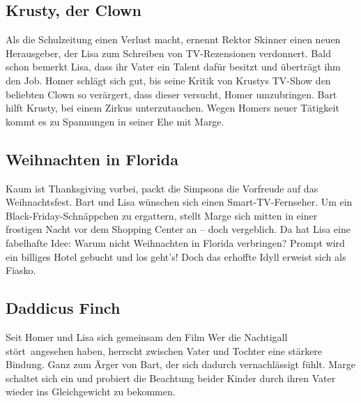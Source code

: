 
\subsection{Krusty, der Clown}
Als die Schulzeitung einen Verlust macht, ernennt Rektor Skinner einen neuen Herausgeber, der Lisa zum Schreiben von TV-Rezensionen verdonnert. Bald schon bemerkt Lisa, dass ihr Vater ein Talent dafür besitzt und überträgt ihm den Job. Homer schlägt sich gut, bis seine Kritik von Krustys TV-Show den beliebten Clown so verärgert, dass dieser versucht, Homer umzubringen. Bart hilft Krusty, bei einem Zirkus unterzutauchen. Wegen Homers neuer Tätigkeit kommt es zu Spannungen in seiner Ehe mit Marge.


\subsection{Weihnachten in Florida}\label{YABF02}
Kaum ist Thanksgiving vorbei, packt die Simpsons die Vorfreude auf das Weihnachtsfest. Bart und Lisa wünschen sich einen Smart-TV-Fernseher. Um ein Black-Friday-Schnäppchen zu ergattern, stellt Marge sich mitten in einer frostigen Nacht vor dem Shopping Center an -- doch vergeblich. Da hat Lisa eine fabelhafte Idee: Warum nicht Weihnachten in Florida verbringen? Prompt wird ein billiges Hotel gebucht und los geht's! Doch das erhoffte Idyll erweist sich als Fiasko.


\subsection{Daddicus Finch}\label{YABF01}
Seit Homer und Lisa sich gemeinsam den Film \glqq Wer die Nachtigall stört\grqq\ angesehen haben, herrscht zwischen Vater und Tochter eine stärkere Bindung. Ganz zum Ärger von Bart, der sich dadurch vernachlässigt fühlt. Marge schaltet sich ein und probiert die Beachtung beider Kinder durch ihren Vater wieder ins Gleichgewicht zu bekommen.

